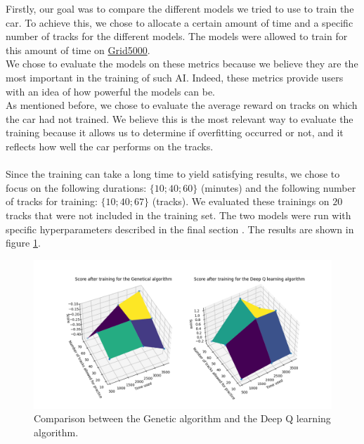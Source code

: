 \documentclass[11pt,a4paper]{article}
\newcounter{fig}
\begin{document}
Firstly, our goal was to compare the different models we tried to use to train the car. To achieve this, we chose to allocate a certain amount of time and a specific number of tracks for the different models. The models were allowed to train for this amount of time on \href{https://www.grid5000.fr}{Grid5000}.\\

We chose to evaluate the models on these metrics because we believe they are the most important in the training of such AI. Indeed, these metrics provide users with an idea of how powerful the models can be.\\

As mentioned before, we chose to evaluate the average reward on tracks on which the car had not trained. We believe this is the most relevant way to evaluate the training because it allows us to determine if overfitting occurred or not, and it reflects how well the car performs on the tracks.\\
\\
Since the training can take a long time to yield satisfying results, we chose to focus on the following durations: $\{10;40;60\}$ (minutes) and the following number of tracks for training: $\{10;40;67\}$ (tracks). We evaluated these trainings on $20$ tracks that were not included in the training set. The two models were run with specific hyperparameters described in the final section \pageref{Hyperparameters}. 
The results are shown in figure \ref{figure:compare GA VS DQ}.
        \begin{figure}[ht]
            \centering
            \includegraphics[scale = 0.65]{graphe_comparaison.png}
            \caption{Comparison between the Genetic algorithm and the Deep Q learning algorithm.}
            \label{figure:compare GA VS DQ}
        \end{figure}
\end{document}
